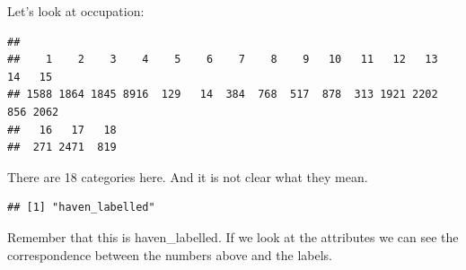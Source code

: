 \documentclass[]{book}
\newenvironment{Shaded}{\begin{snugshade}}{\end{snugshade}}
\newcommand{\KeywordTok}[1]{\textcolor[rgb]{0.13,0.29,0.53}{\textbf{#1}}}
\newcommand{\NormalTok}[1]{#1}
\newcommand{\OperatorTok}[1]{\textcolor[rgb]{0.81,0.36,0.00}{\textbf{#1}}}
\theoremstyle{definition}
\theoremstyle{definition}
\theoremstyle{definition}
\theoremstyle{remark}
\begin{document}
Let's look at occupation:

\begin{Shaded}
\end{Shaded}

\begin{verbatim}
## 
##    1    2    3    4    5    6    7    8    9   10   11   12   13   14   15 
## 1588 1864 1845 8916  129   14  384  768  517  878  313 1921 2202  856 2062 
##   16   17   18 
##  271 2471  819
\end{verbatim}

There are 18 categories here. And it is not clear what they mean.

\begin{Shaded}
\end{Shaded}

\begin{verbatim}
## [1] "haven_labelled"
\end{verbatim}

Remember that this is haven\_labelled. If we look at the attributes we
can see the correspondence between the numbers above and the labels.

\begin{Shaded}
\end{Shaded}
\end{document}
